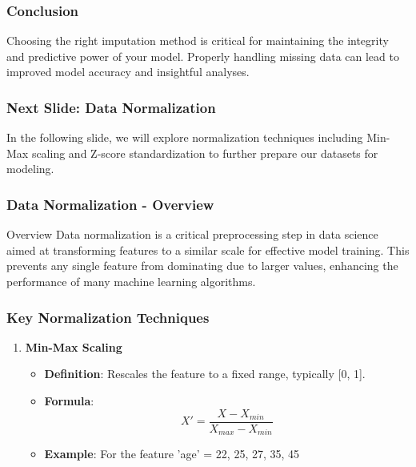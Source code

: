 \documentclass[aspectratio=169]{beamer}
\begin{document}
\begin{frame}[fragile]
    \frametitle{Conclusion}
    Choosing the right imputation method is critical for maintaining the integrity and predictive power of your model. Properly handling missing data can lead to improved model accuracy and insightful analyses.
\end{frame}

\begin{frame}[fragile]
    \frametitle{Next Slide: Data Normalization}
    In the following slide, we will explore normalization techniques including Min-Max scaling and Z-score standardization to further prepare our datasets for modeling.
\end{frame}

\begin{frame}
    \frametitle{Data Normalization - Overview}
    \begin{block}{Overview}
        Data normalization is a critical preprocessing step in data science aimed at transforming features to a similar scale for effective model training. 
        This prevents any single feature from dominating due to larger values, enhancing the performance of many machine learning algorithms.
    \end{block}
\end{frame}

\begin{frame}
    \frametitle{Key Normalization Techniques}
    \begin{enumerate}
        \item \textbf{Min-Max Scaling}
        \begin{itemize}
            \item \textbf{Definition}: Rescales the feature to a fixed range, typically [0, 1].
            \item \textbf{Formula}:
            \begin{equation}
                X' = \frac{X - X_{min}}{X_{max} - X_{min}}
            \end{equation}
            \item \textbf{Example}: For the feature 'age' = {22, 25, 27, 35, 45}
        \end{itemize}
    \end{enumerate}
\end{frame}
\end{document}
